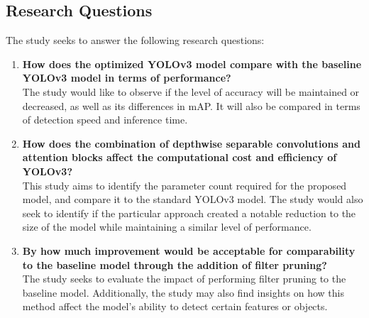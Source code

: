 \subsection{Research Questions}
The study seeks to answer the following research questions:
\begin{enumerate}
    \item \textbf{How does the optimized YOLOv3 model compare with the baseline YOLOv3 model in terms of performance?} \\
    The study would like to observe if the level of accuracy will be maintained or decreased, as well as its differences in mAP. It will also be compared in terms of detection speed and inference time. \newline
    \item \textbf{How does the combination of depthwise separable convolutions and attention blocks affect the computational cost and efficiency of YOLOv3?} \\
    This study aims to identify the parameter count required for the proposed model, and compare it to the standard YOLOv3 model. The study would also seek to identify if the particular approach created a notable reduction to the size of the model while maintaining a similar level of performance. \newline
    \item \textbf{By how much improvement would be acceptable for comparability to the baseline model through the addition of filter pruning?} \\
    The study seeks to evaluate the impact of performing filter pruning to the baseline model. Additionally, the study may also find insights on how this method affect the model's ability to detect certain features or objects.
\end{enumerate}




